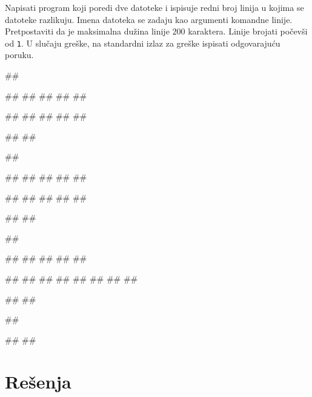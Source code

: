 \begin{Exercise}[label=p3_iv10]         
Napisati program koji poredi dve datoteke i ispisuje redni broj linija u
kojima se datoteke razlikuju. Imena datoteka se zadaju kao argumenti
komandne linije. Pretpostaviti da je maksimalna dužina
linije $200$ karaktera. Linije brojati počevši od {\tt 1}.
 U slučaju greške, na standardni izlaz za greške ispisati odgovarajuću poruku.

\begin{miditest}
\begin{upotreba}{1}
##

##
##
##
##
##

##
##
##
##
##

#\naslovIzlaz#
#\izlaz{}#
\end{upotreba}
\end{miditest}
\begin{miditest}
\begin{upotreba}{2}
##

##
##
##
##
##

##
##
##
##
##

#\naslovIzlaz#
##
\end{upotreba}
\end{miditest}

\begin{miditest}
\begin{upotreba}{3}
##

##
##
##
##
##

##
##
##
##
##
##
##
##

#\naslovIzlaz#
##
\end{upotreba}
\end{miditest}
\begin{miditest}
\begin{upotreba}{4}
##

#\naslovIzlazZaGresku#
##
\end{upotreba}
\end{miditest}
\end{Exercise}
\begin{Answer}[ref=p3_iv10]
\end{Answer}




\section{Rešenja}


\shipoutAnswer


